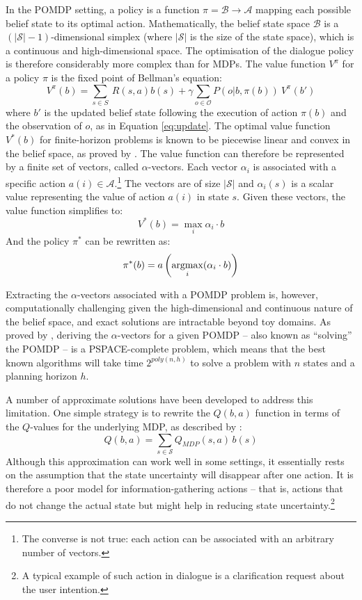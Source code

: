 In the POMDP setting, a policy is a function $\pi = \mathcal{B} \rightarrow \mathcal{A}$ mapping each possible belief state to its optimal action.  Mathematically, the belief state space $\mathcal{B}$ is a $(|\mathcal{S}|\!-\!1)$-dimensional simplex (where $|\mathcal{S}|$ is the size of the state space), which is a continuous and high-dimensional space. The optimisation of the dialogue policy is therefore considerably more complex than for MDPs. The value function $V^{\pi}$ for a policy $\pi$ is the fixed point of Bellman's equation: 
\begin{equation}
V^{\pi}(b) = \sum_{s \in S} \ R(s,a) b(s) + \gamma \sum_{o \in \mathcal{O}} P(o|b,\pi(b)) \ V^{\pi}(b')
\end{equation}
where $b'$ is the updated belief state following the execution of action $\pi(b)$ and the observation of $o$, as in Equation \eqref{eq:update}.  The optimal value function $V^*(b)$ for finite-horizon problems is known to be piecewise linear and convex in the belief space, as proved by \cite{Sondik1971}. The value function can therefore be represented by a finite set of vectors, called $\alpha$-vectors. Each vector $\alpha_i$ is associated with a specific action $a(i) \in \mathcal{A}$.\footnote{The converse is not true: each action can be associated with an arbitrary number of vectors.}  The vectors are of size $|\mathcal{S}|$ and $\alpha_i(s)$ is a scalar value representing the value of action $a(i)$ in state $s$.  Given these vectors, the value function simplifies to:
\begin{equation}
V^*(b) = \max_{i} \alpha_i \cdot b
\end{equation}
And the policy $\pi^*$ can be rewritten as:
\begin{equation}
\pi^*(b) = a\left(\argmax_i(\alpha_i \cdot b)\right)
\end{equation}

Extracting the $\alpha$-vectors associated with a POMDP problem is, however, computationally challenging given the high-dimensional and continuous nature of the belief space, and exact solutions are intractable beyond toy domains. As proved by \cite{Papadimitriou:1987}, deriving the $\alpha$-vectors for a given POMDP -- also known as ``solving'' the POMDP -- is a PSPACE-complete problem, which means that the best known algorithms will take time $2^{poly(n,h)}$ to solve a problem with $n$ states and a planning horizon $h$.

A number of approximate solutions have been developed to address this limitation.  One simple strategy is to rewrite the $Q(b,a)$ function in terms of the $Q$-values for the underlying MDP, as described by \cite{Littman:1997}:
\begin{equation}
Q(b,a) = \sum_{s \in \mathcal{S}} Q_{\mathit{MDP}} (s,a)\, b(s)
\end{equation}
Although this approximation can work well in some settings, it essentially rests on the assumption that the state uncertainty will disappear after one action.  It is therefore a poor model for information-gathering actions -- that is, actions that do not change the actual state but might help in reducing state uncertainty.\footnote{A typical example of such action in dialogue is a clarification request about the user intention.} 

